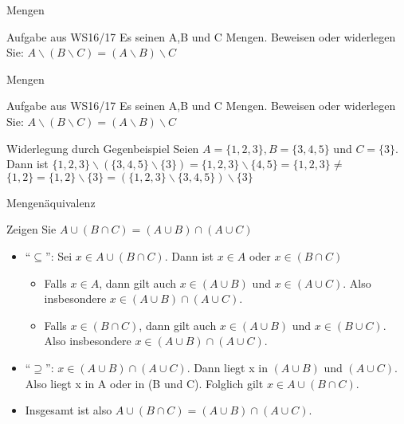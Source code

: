\documentclass[]{beamer}
\begin{document}
\begin{frame}{Mengen}
	\begin{block}{Aufgabe aus WS16/17}
		Es seinen A,B und C Mengen. Beweisen oder widerlegen Sie:
		$A \backslash (B \backslash C) = (A \backslash B)\backslash C$
	\end{block}
\end{frame}
\begin{frame}{Mengen}
	\begin{block}{Aufgabe aus WS16/17}
		Es seinen A,B und C Mengen. Beweisen oder widerlegen Sie:
		$A \backslash (B \backslash C) = (A \backslash B)\backslash C$
	\end{block}
	\begin{block}{Widerlegung durch Gegenbeispiel}
		Seien $A = \{1,2,3\}, B = \{3,4,5\}$ und $C = \{3\}$.
		Dann ist $\{1,2,3\} \backslash (\{3,4,5\} \backslash \{3\}) = \{1,2,3\} \backslash \{4,5\} = \{1,2,3\} \neq$
		$\{1,2\} = \{1,2\} \backslash \{3\} = (\{1,2,3\} \backslash \{3,4,5\}) \backslash \{3\}$
	\end{block}
\end{frame}
\begin{frame}{Mengenäquivalenz}
	\begin{block}{Zeigen Sie}
		$A \cup (B \cap C) = (A \cup B) \cap (A \cup C)$
		\begin{itemize}
			\pause\item ``$\subseteq$'': Sei $x \in A \cup (B\cap C).$ Dann ist $x \in A$ oder $x \in (B \cap C)$
			\begin{itemize}
				\pause
				\item Falls $x\in A$, dann gilt auch $x\in (A\cup B)$ und $x\in (A\cup C)$. Also
				insbesondere $x\in(A\cup B)\cap(A\cup C)$.
				\pause
				\item Falls $x\in(B\cap C)$, dann gilt auch $x\in (A\cup B)$ und $x\in (B\cup C)$. Also
				insbesondere $x\in(A\cup B)\cap(A\cup C)$.
				\pause
			\end{itemize}
			\item ``$\supseteq$'': $x\in(A\cup B)\cap(A\cup C)$. Dann liegt x in $(A\cup B)$ und $(A\cup C)$.
			Also liegt x in A oder in (B und C). Folglich gilt 
			$x\in A\cup(B\cap C)$.
			\pause\item Insgesamt ist also $A\cup(B\cap C) = (A\cup B)\cap(A\cup C)$.
		\end{itemize}
	\end{block}
\end{frame}
\end{document}
